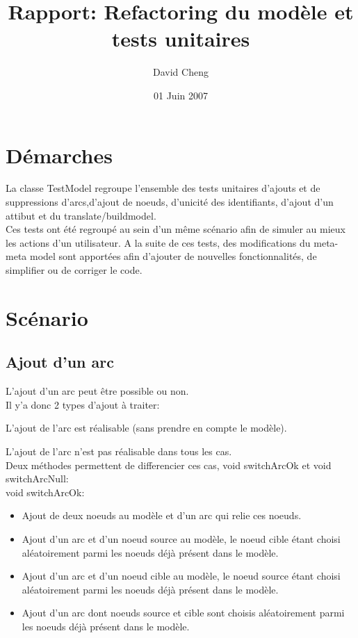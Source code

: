 \documentclass{article}
\title{Rapport: Refactoring du mod\`ele et tests unitaires}
\author{David Cheng}
\date{01 Juin 2007}
\begin{document}
\maketitle
\section{D\'emarches}

La classe TestModel regroupe l'ensemble des tests unitaires d'ajouts et de suppressions d'arcs,d'ajout de noeuds, d'unicit\'e des identifiants, 
d'ajout d'un attibut et du translate/buildmodel.\\

Ces tests ont \'et\'e regroup\'e au sein d'un m\^eme sc\'enario afin de simuler au mieux les actions d'un utilisateur.
A la suite de ces tests, des modifications du meta-meta model sont apport\'ees afin d'ajouter 
de nouvelles fonctionnalit\'es, de simplifier ou de corriger le code.


\section{Sc\'enario}
\subsection{Ajout d'un arc}

L'ajout d'un arc peut \^etre possible ou non.\\

Il y'a donc 2 types d'ajout \`a traiter:

L'ajout de l'arc est r\'ealisable (sans prendre en compte le mod\`ele).

L'ajout de l'arc n'est pas r\'ealisable dans tous les cas.\\

Deux m\'ethodes permettent de differencier ces cas, void switchArcOk et void switchArcNull:\\

void switchArcOk:

\begin{itemize}
\item Ajout de deux noeuds au mod\`ele et d'un arc qui relie ces noeuds.

\item Ajout d'un arc et d'un noeud source au mod\`ele, le noeud cible \'etant 
choisi al\'eatoirement parmi les noeuds d\'ej\`a pr\'esent dans le mod\`ele.

\item Ajout d'un arc et d'un noeud cible au mod\`ele, le noeud source \'etant 
choisi al\'eatoirement parmi les noeuds d\'ej\`a pr\'esent dans le mod\`ele.

\item Ajout d'un arc dont noeuds source et cible sont choisis al\'eatoirement 
parmi les noeuds d\'ej\`a pr\'esent dans le mod\`ele.\\
\end{itemize}
\end{document}
